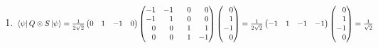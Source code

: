 \documentclass[a4paper,12pt]{article}
\begin{document}
\begin{enumerate}[label=(\alph*)]
\begin{enumerate}[label=(\roman*)]
            \item $\bra{\psi}Q\otimes S\ket{\psi} = \frac{1}{2\sqrt{2}}\begin{pmatrix}
                0 & 1 & -1 & 0
            \end{pmatrix} \begin{pmatrix}
                -1 & -1 & \phantom{-}0 & \phantom{-}0\\
                -1 & \phantom{-}1 & \phantom{-}0 &\phantom{-}0 \\
                \phantom{-}0 & \phantom{-}0 & \phantom{-}1 & \phantom{-}1 \\
                \phantom{-}0 & \phantom{-}0 & \phantom{-}1 & -1 \\
            \end{pmatrix}\begin{pmatrix}
                \phantom{-}0 \\
                \phantom{-}1 \\
                -1\\
                \phantom{-}0\\
            \end{pmatrix}=\frac{1}{2\sqrt{2}}\begin{pmatrix}
                -1 & 1 & -1 & -1\\
            \end{pmatrix} \begin{pmatrix}
                \phantom{-}0 \\
                \phantom{-}1 \\
                -1 \\
                \phantom{-}0 \\
            \end{pmatrix} = \frac{1}{\sqrt{2}}$


\end{enumerate}
\end{enumerate}
\end{document}

